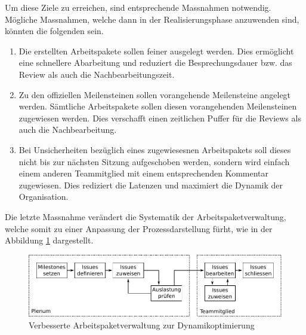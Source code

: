 \noindent
Um diese Ziele zu erreichen, sind entsprechende Massnahmen notwendig.
Mögliche Massnahmen, welche dann in der Realisierungsphase anzuwenden sind,
könnten die folgenden sein.

\begin{enumerate}
	\item Die erstellten Arbeitspakete sollen feiner ausgelegt werden.
		Dies ermöglicht eine schnellere Abarbeitung und reduziert
		die Besprechungsdauer bzw. das Review als auch die
		Nachbearbeitungszeit.
	\item Zu den offiziellen Meilensteinen sollen vorangehende
		Meilensteine angelegt werden. Sämtliche Arbeitspakete sollen
		diesen vorangehenden Meilensteinen zugewiesen werden.
		Dies verschafft einen zeitlichen Puffer für die Reviews als
		auch die Nachbearbeitung.
	\item Bei Unsicherheiten bezüglich eines zugewiesesnen Arbeitspakets
		soll dieses nicht bis zur nächsten Sitzung aufgeschoben werden,
		sondern wird einfach einem anderen Teammitglied mit einem
		entsprechenden Kommentar zugewiesen. Dies rediziert die
		Latenzen und maximiert die Dynamik der Organisation.
\end{enumerate}

Die letzte Massnahme verändert die Systematik der Arbeitspaketverwaltung,
welche somit zu einer Anpassung der Prozessdarstellung fürht, wie in der
Abbildung \ref{fig:pm-issue-02} dargestellt.

\begin{figure}[h!]
	\centering
	\includegraphics[scale=1]{../../fig/pm/issue_02.pdf}
	\caption{Verbesserte Arbeitspaketverwaltung zur Dynamikoptimierung}
	\label{fig:pm-issue-02}
\end{figure}
